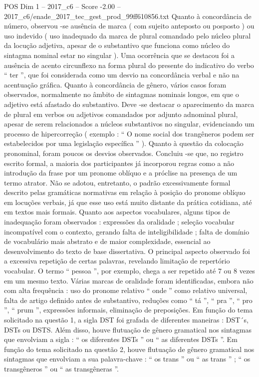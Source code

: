 \begin{textsample}{POS Dim 1 – 2017\_c6 – Score -2.00 – 2017\_c6/enade\_2017\_tec\_gest\_prod\_99ff610856.txt}
Quanto à concordância de número, observou -se ausência de marca ( com sujeito anteposto ou posposto ) ou uso indevido ( uso inadequado da marca de plural comandado pelo núcleo plural da locução adjetiva, apesar de o substantivo que funciona como núcleo do sintagma nominal estar no singular ).
Uma ocorrência que se destacou foi a ausência de acento circunflexo na forma plural do presente do indicativo do verbo “ ter ”, que foi considerada como um desvio na concordância verbal e não na acentuação gráfica.
Quanto à concordância de gênero, vários casos foram observados, normalmente no âmbito de sintagmas nominais longos, em que o adjetivo está afastado do substantivo.
Deve -se destacar o aparecimento da marca de plural em verbos ou adjetivos comandados por adjunto adnominal plural, apesar de serem relacionados a núcleos substantivos no singular, evidenciando um processo de hipercorreção ( exemplo : “ O nome social dos trangêneros podem ser estabelecidos por uma legislação específica ” ).
Quanto à questão da colocação pronominal, foram poucos os desvios observados.
Concluiu -se que, no registro escrito formal, a maioria dos participantes já incorporou regras como a não introdução da frase por um pronome oblíquo e a próclise na presença de um termo atrator.
Não se adotou, entretanto, o padrão excessivamente formal descrito pelas gramáticas normativas em relação à posição do pronome oblíquo em locuções verbais, já que esse uso está muito distante da prática cotidiana, até em textos mais formais.
Quanto aos aspectos vocabulares, alguns tipos de inadequação foram observados : expressões da oralidade ; seleção vocabular incompatível com o contexto, gerando falta de inteligibilidade ; falta de domínio de vocabulário mais abstrato e de maior complexidade, essencial ao desenvolvimento do texto de base dissertativa.
O principal aspecto observado foi a excessiva repetição de certas palavras, revelando limitação de repertório vocabular.
O termo “ pessoa ”, por exemplo, chega a ser repetido até 7 ou 8 vezes em um mesmo texto.
Várias marcas de oralidade foram identificadas, embora não com alta frequência : uso do pronome relativo “ onde ” como relativo universal, falta de artigo definido antes de substantivo, reduções como “ tá ”, “ pra ”, “ pro ”, “ prum ”, expressões informais, eliminação de preposições.
Em função do tema solicitado na questão 1, a sigla DST foi grafada de diferentes maneiras : DST´s, DSTs ou DSTS.
Além disso, houve flutuação de gênero gramatical nos sintagmas que envolviam a sigla : “ os diferentes DSTs ” ou “ as diferentes DSTs ”.
Em função do tema solicitado na questão 2, houve flutuação de gênero gramatical nos sintagmas que envolviam a sua palavra-chave : “ os trans ” ou “ as trans ” ; “ os transgêneros ” ou “ as transgêneras ”.

\end{textsample}

